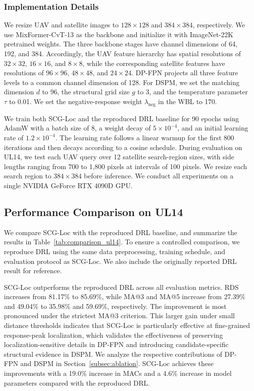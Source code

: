 \documentclass[runningheads]{llncs}
\begin{document}
\subsubsection{Implementation Details}

We resize UAV and satellite images to $128\times128$ and $384\times384$, respectively. We use MixFormer-CvT-13 as the backbone and initialize it with ImageNet-22K pretrained weights. The three backbone stages have channel dimensions of 64, 192, and 384. Accordingly, the UAV feature hierarchy has spatial resolutions of $32\times32$, $16\times16$, and $8\times8$, while the corresponding satellite features have resolutions of $96\times96$, $48\times48$, and $24\times24$. DP-FPN projects all three feature levels to a common channel dimension of 128. For DSPM, we set the matching dimension $d$ to 96, the structural grid size $g$ to 3, and the temperature parameter $\tau$ to 0.01. We set the negative-response weight $\lambda_{\mathrm{neg}}$ in the WBL to 170.

We train both SCG-Loc and the reproduced DRL baseline for 90 epochs using AdamW with a batch size of 8, a weight decay of $5\times10^{-4}$, and an initial learning rate of $1.2\times10^{-4}$. The learning rate follows a linear warmup for the first 800 iterations and then decays according to a cosine schedule. During evaluation on UL14, we test each UAV query over 12 satellite search-region sizes, with side lengths ranging from 700 to 1,800 pixels at intervals of 100 pixels. We resize each search region to $384\times384$ before inference. We conduct all experiments on a single NVIDIA GeForce RTX 4090D GPU.

\subsection{Performance Comparison on UL14}

We compare SCG-Loc with the reproduced DRL baseline, and summarize the results in Table~\ref{tab:comparison_ul14}. To ensure a controlled comparison, we reproduce DRL using the same data preprocessing, training schedule, and evaluation protocol as SCG-Loc. We also include the originally reported DRL result for reference.

SCG-Loc outperforms the reproduced DRL across all evaluation metrics. RDS increases from 81.17\% to 85.69\%, while MA@3 and MA@5 increase from 27.39\% and 49.04\% to 35.98\% and 59.69\%, respectively. The improvement is most pronounced under the strictest MA@3 criterion. This larger gain under small distance thresholds indicates that SCG-Loc is particularly effective at fine-grained response-peak localization, which validates the effectiveness of preserving localization-sensitive details in DP-FPN and introducing candidate-specific structural evidence in DSPM. We analyze the respective contributions of DP-FPN and DSPM in Section~\ref{subsec:ablation}. SCG-Loc achieves these improvements with a 19.0\% increase in MACs and a 4.6\% increase in model parameters compared with the reproduced DRL.
\end{document}
